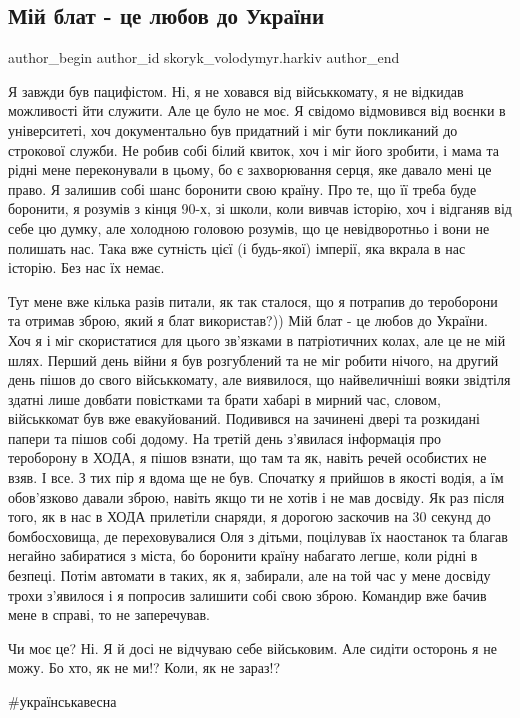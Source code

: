  
 
 
 
 
 
\subsection{Мій блат - це любов до України}
\label{sec:11_03_2022.fb.skoryk_volodymyr.harkiv.1.blat_lubov_do_ukrainy}
 
\ifcmt
 author_begin
   author_id skoryk_volodymyr.harkiv
 author_end
\fi

Я завжди був пацифістом. Ні, я не ховався від військкомату, я не відкидав
можливості йти служити. Але це було не моє. Я свідомо відмовився від воєнки в
університеті, хоч документально був придатний і міг бути покликаний до
строкової служби. Не робив собі білий квиток, хоч і міг його зробити, і мама та
рідні мене переконували в цьому, бо є захворювання серця, яке давало мені це
право. Я залишив собі шанс боронити свою країну. Про те, що її треба буде
боронити, я розумів з кінця 90-х, зі школи, коли вивчав історію, хоч і відганяв
від себе цю думку, але холодною головою розумів, що це невідворотньо і вони не
полишать нас. Така вже сутність цієї (і будь-якої) імперії, яка вкрала в нас
історію. Без нас їх немає.


Тут мене вже кілька разів питали, як так сталося, що я потрапив до тероборони
та отримав зброю, який я блат використав?)) Мій блат - це любов до України. Хоч
я і міг скористатися для цього зв'язками в патріотичних колах, але це не мій
шлях. Перший день війни я був розгублений та не міг робити нічого, на другий
день пішов до свого військкомату, але виявилося, що найвеличніші вояки звідтіля
здатні лише довбати повістками та брати хабарі в мирний час, словом,
військкомат був вже евакуйований. Подивився на зачинені двері та розкидані
папери та пішов собі додому. На третій день з'явилася інформація про тероборону
в ХОДА, я пішов взнати, що там та як, навіть речей особистих не взяв. І все. З
тих пір я вдома ще не був. Спочатку я прийшов в якості водія, а їм обов'язково
давали зброю, навіть якщо ти не хотів і не мав досвіду. Як раз після того, як в
нас в ХОДА прилетіли снаряди, я дорогою заскочив на 30 секунд до бомбосховища,
де переховувалися Оля з дітьми, поцілував їх наостанок та благав негайно
забиратися з міста, бо боронити країну набагато легше, коли рідні в безпеці.
Потім автомати в таких, як я, забирали, але на той час у мене досвіду трохи
з'явилося і я попросив залишити собі свою зброю. Командир вже бачив мене в
справі, то не заперечував.

Чи моє це? Ні. Я й досі не відчуваю себе військовим. Але сидіти осторонь я не
можу. Бо хто, як не ми!? Коли, як не зараз!?

\#українськавесна


